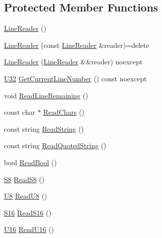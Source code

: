 \subsection*{Protected Member Functions}
\begin{DoxyCompactItemize}
\item 
\hyperlink{classmage_1_1_line_reader_ab4a46321d7ea3ecda2d6390c78a7285b}{Line\+Reader} ()
\item 
\hyperlink{classmage_1_1_line_reader_ae4f871bebae110704b34c0bd88460639}{Line\+Reader} (const \hyperlink{classmage_1_1_line_reader}{Line\+Reader} \&reader)=delete
\item 
\hyperlink{classmage_1_1_line_reader_ae90c546a98e113a48ca1c94b854a4866}{Line\+Reader} (\hyperlink{classmage_1_1_line_reader}{Line\+Reader} \&\&reader) noexcept
\item 
\hyperlink{namespacemage_a41c104c036fba3756a74e19f793eeaa1}{U32} \hyperlink{classmage_1_1_line_reader_aa0ed768e2799b74f2341c56fc6ac4969}{Get\+Current\+Line\+Number} () const noexcept
\item 
void \hyperlink{classmage_1_1_line_reader_a3a4b99bfef1e8a826d74a01bcc663fcb}{Read\+Line\+Remaining} ()
\item 
const char $\ast$ \hyperlink{classmage_1_1_line_reader_ad915c1a17549c7758c10f0b6db7e5611}{Read\+Chars} ()
\item 
const string \hyperlink{classmage_1_1_line_reader_a58a27b637574ce56ea17a575aa540675}{Read\+String} ()
\item 
const string \hyperlink{classmage_1_1_line_reader_ae9a7547d01b29c3237b198444d4f3aef}{Read\+Quoted\+String} ()
\item 
bool \hyperlink{classmage_1_1_line_reader_a86289c358afe9b3bc5c7789bb8a6af95}{Read\+Bool} ()
\item 
\hyperlink{namespacemage_a20766a773cfd6c14d8f2344d4631b89c}{S8} \hyperlink{classmage_1_1_line_reader_a39a5e24bb2b416c56a98cabd93efcc73}{Read\+S8} ()
\item 
\hyperlink{namespacemage_afc638980bc6154f15af5e2d93a0e0ea9}{U8} \hyperlink{classmage_1_1_line_reader_a5fcc116b81d0357acdb9641e8f293e31}{Read\+U8} ()
\item 
\hyperlink{namespacemage_add9d3fe59b2a338108e98fcd67507005}{S16} \hyperlink{classmage_1_1_line_reader_a9f3ca4ad3606d9b67a90698c2b71bdd0}{Read\+S16} ()
\item 
\hyperlink{namespacemage_af69057eec1ce005c1c3b34ae33486f16}{U16} \hyperlink{classmage_1_1_line_reader_ac182214e611518cb8b8c1f8cd6b08f0c}{Read\+U16} ()
\item 

\end{DoxyCompactItemize}
